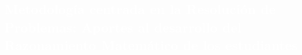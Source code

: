 \begin{titlepage}
\pagecolor{white}
\newcommand{\R}{\ensuremath{\mathbb{R}}}
\BgThispage
{}
\vspace*{-1.1cm}
\noindent
\def\titulo#1{\section{#1}}

\section{\bf\large\textcolor{white}{Metodolog\'ia centrada en la Resoluci\'on de Problemas: 
Aportes al desarrollo del Razonamiento
 Matem\'atico de los estudiantes}}
\vspace*{2cm}\par
\noindent


\end{titlepage}
